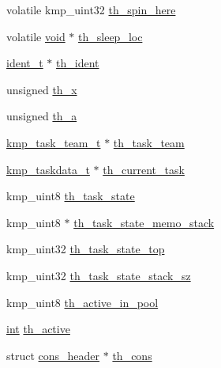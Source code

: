 \begin{DoxyCompactItemize}
\item 
volatile kmp\-\_\-uint32 \hyperlink{structkmp__base__info_ab939b611f51b7e2c41d24682469d830b}{th\-\_\-spin\-\_\-here}
\item 
volatile \hyperlink{ittnotify__static_8h_af941d56e55e3c5465135b60c4d6343ed}{void} $\ast$ \hyperlink{structkmp__base__info_ab8cdb45ccd6ce5afbebc735e740ed521}{th\-\_\-sleep\-\_\-loc}
\item 
\hyperlink{group__BASIC__TYPES_ga690fda6b92f039a72db263c6b4394ddb}{ident\-\_\-t} $\ast$ \hyperlink{structkmp__base__info_ae9082db92f2664d4c077862cb3cfc1a7}{th\-\_\-ident}
\item 
unsigned \hyperlink{structkmp__base__info_ade96af70a102039d5a6541c992178749}{th\-\_\-x}
\item 
unsigned \hyperlink{structkmp__base__info_aa7681a0885f659ef85fa65bfe68352e6}{th\-\_\-a}
\item 
\hyperlink{kmp_8h_a1570ef2f4a50702c1be60039e4f5e605}{kmp\-\_\-task\-\_\-team\-\_\-t} $\ast$ \hyperlink{structkmp__base__info_a282edcc15b1d3fa565c3c2faee030138}{th\-\_\-task\-\_\-team}
\item 
\hyperlink{kmp_8h_af73aa077ec760ca83750f8144a5e65fb}{kmp\-\_\-taskdata\-\_\-t} $\ast$ \hyperlink{structkmp__base__info_a1c7bb182836b7c81e110ef3e9612c362}{th\-\_\-current\-\_\-task}
\item 
kmp\-\_\-uint8 \hyperlink{structkmp__base__info_aef78a041104c00baf7fbadf6d773ec20}{th\-\_\-task\-\_\-state}
\item 
kmp\-\_\-uint8 $\ast$ \hyperlink{structkmp__base__info_a639cb35ebbee586cab63b1009b58cedd}{th\-\_\-task\-\_\-state\-\_\-memo\-\_\-stack}
\item 
kmp\-\_\-uint32 \hyperlink{structkmp__base__info_a48b13afdce18fdf958925f449b734c34}{th\-\_\-task\-\_\-state\-\_\-top}
\item 
kmp\-\_\-uint32 \hyperlink{structkmp__base__info_acf1b69326c64788ada477ac832f4d80e}{th\-\_\-task\-\_\-state\-\_\-stack\-\_\-sz}
\item 
kmp\-\_\-uint8 \hyperlink{structkmp__base__info_a8314fc01deddcc18cab43aa4ba3098a6}{th\-\_\-active\-\_\-in\-\_\-pool}
\item 
\hyperlink{ittnotify__static_8h_a8b8dcd723308a8cb5d84277c7a3fff70}{int} \hyperlink{structkmp__base__info_af7578fa494e619f5fc8bab453f6e6e16}{th\-\_\-active}
\item 
struct \hyperlink{structcons__header}{cons\-\_\-header} $\ast$ \hyperlink{structkmp__base__info_a5a43bb0d55e068192da1397b326266ee}{th\-\_\-cons}
\item 

\end{DoxyCompactItemize}
